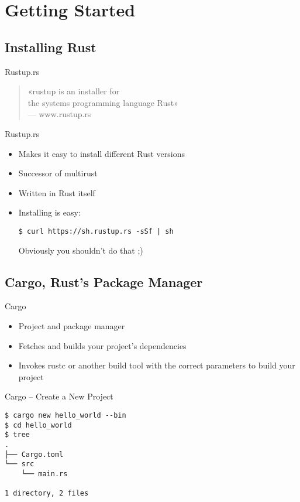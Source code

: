 \section{Getting Started}

\subsection{Installing Rust}

\begin{frame}[c]{Rustup.rs}
\begin{quote}
«rustup is an installer for \\
the systems programming language Rust» \\
\vspace{0.5em}
{\normalfont \small --- www.rustup.rs}
\end{quote}
\end{frame}

\begin{frame}[fragile]{Rustup.rs}
\begin{itemize}
    \item Makes it easy to install different Rust versions
    \item Successor of multirust
    \item Written in Rust itself
    \pause\item Installing is easy:
\begin{verbatim}
$ curl https://sh.rustup.rs -sSf | sh
\end{verbatim}
    \pause Obviously you shouldn't do that ;)
\end{itemize}
\end{frame}

\subsection{Cargo, Rust's Package Manager}
\begin{frame}[c]{Cargo}
    \begin{itemize}
        \item Project and package manager
        \item Fetches and builds your project’s dependencies
        \item Invokes rustc or another build tool with the correct parameters
            to build your project
    \end{itemize}
\end{frame}
\begin{frame}[fragile]{Cargo -- Create a New Project}
\begin{verbatim}
$ cargo new hello_world --bin
$ cd hello_world
$ tree
.
├── Cargo.toml
└── src
    └── main.rs

1 directory, 2 files
\end{verbatim}
\end{frame}

